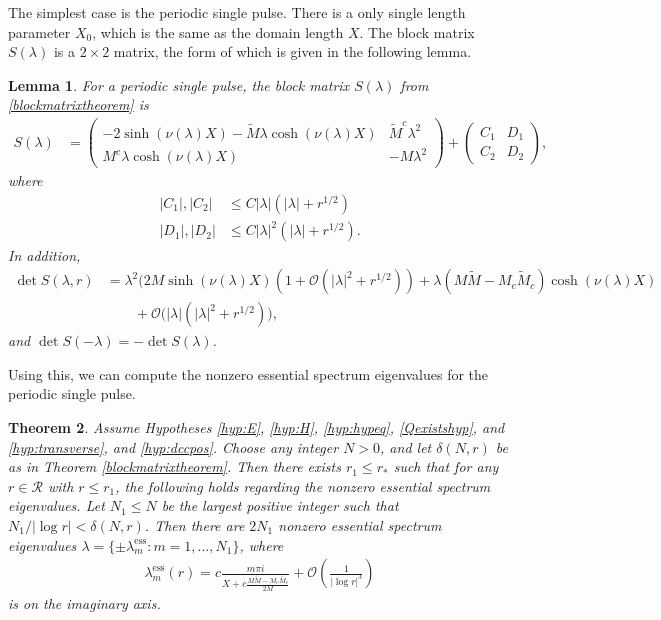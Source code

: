 \documentclass[10pt,reqno]{amsart}
\theoremstyle{plain}
\newtheorem{theorem}{Theorem}
\newtheorem{lemma}[theorem]{Lemma}
\theoremstyle{definition}
\theoremstyle{remark}
\numberwithin{theorem}{section}
\numberwithin{equation}{section}
\begin{document}
The simplest case is the periodic single pulse. There is a only single length parameter $X_0$, which is the same as the domain length $X$. The block matrix $S(\lambda)$ is a $2\times 2$ matrix, the form of which is given in the following lemma.

\begin{lemma}\label{lemma:1blockmatrix}
For a periodic single pulse, the block matrix $S(\lambda)$ from \cref{blockmatrixtheorem} is 
\begin{align}\label{1pblockmatrix}
S(\lambda) &= 
\begin{pmatrix}
-2 \sinh(\nu(\lambda) X) - \tilde{M}\lambda \cosh(\nu(\lambda) X) & \tilde{M}^c \lambda^2 \\
M^c \lambda \cosh(\nu(\lambda)X) & - M \lambda^2
\end{pmatrix} +
\begin{pmatrix}
C_1 & D_1 \\ C_2 & D_2
\end{pmatrix},
\end{align}
where
\begin{align*}
|C_1|, |C_2| &\leq C |\lambda|(|\lambda| + r^{1/2}) \\
|D_1|, |D_2| &\leq C |\lambda|^2(|\lambda| + r^{1/2}).
\end{align*}
In addition,
\begin{equation}\label{1pblockmatrixdet}
\begin{aligned}
\det S(\lambda, r) &= \lambda^2 \Big( 2 M \sinh(\nu(\lambda)X)(1 + \mathcal{O}(|\lambda|^2 + r^{1/2})) + \lambda(M \tilde{M} - M_c \tilde{M}_c)\cosh(\nu(\lambda)X) \\
&\qquad+ \mathcal{O}(|\lambda|(|\lambda|^2 + r^{1/2}) \Big),
\end{aligned}
\end{equation}
and $\det S(-\lambda) = -\det S(\lambda)$.
\end{lemma}

Using this, we can compute the nonzero essential spectrum eigenvalues for the periodic single pulse. 

\begin{theorem}\label{theorem:1pess}
Assume Hypotheses \ref{hyp:E}, \ref{hyp:H}, \ref{hyp:hypeq}, \ref{Qexistshyp}, and \ref{hyp:transverse}, and \ref{hyp:dccpos}. Choose any integer $N > 0$, and let $\delta(N,r)$ be as in Theorem \ref{blockmatrixtheorem}. Then there exists $r_1 \leq r_*$ such that for any $r \in \mathcal{R}$ with $r \leq r_1$, the following holds regarding the nonzero essential spectrum eigenvalues. Let $N_1 \leq N$ be the largest positive integer such that $N_1/|\log r| < \delta(N,r)$. Then there are $2N_1$ nonzero essential spectrum eigenvalues $\lambda = \{ \pm \lambda_m^{\text{ess}} : m = 1, \dots, N_1 \}$, where
\begin{align}\label{1pess}
\lambda_m^{\text{ess}}(r) = c \frac{m \pi i}{X + c \frac{M\tilde{M} - M_c\tilde{M_c}}{2 M}} +  \mathcal{O}\left( \frac{1}{|\log r|^3} \right)
\end{align}
is on the imaginary axis.
\end{theorem}
\end{document}
